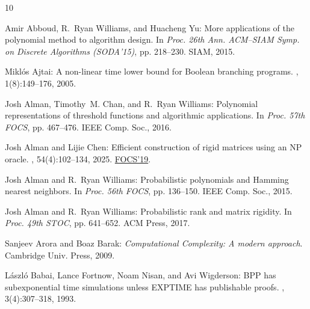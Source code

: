 \documentclass[11pt]{article}
\begin{document}
\tocrefpdfbookmark
\begin{thebibliography}{10}

{\sc Amir Abboud, R.~Ryan Williams, and Huacheng Yu}: More applications of the
  polynomial method to algorithm design.
\newblock In {\em Proc. 26th Ann. ACM--SIAM Symp. on Discrete Algorithms
  (SODA'15)}, pp. 218--230. SIAM, 2015.
\newblock [\epfmtdoi{10.1137/1.9781611973730.17}]

{\sc Mikl{\'o}s Ajtai}: A non-linear time lower bound for {B}oolean branching
  programs.
, 1(8):149--176, 2005.

{\sc Josh Alman, Timothy~M. Chan, and R.~Ryan Williams}: Polynomial
  representations of threshold functions and algorithmic applications.
\newblock In {\em Proc. 57th FOCS}, pp. 467--476. IEEE Comp. Soc., 2016.

{\sc Josh Alman and Lijie Chen}: Efficient construction of rigid matrices using
  an {NP} oracle.
, 54(4):102--134, 2025.
\newblock \prelim \href{https://doi.org/10.1109/FOCS.2019.00067}{FOCS'19}.
\newblock [\epfmtdoi{10.1137/20M1322297}]

{\sc Josh Alman and R.~Ryan Williams}: Probabilistic polynomials and {H}amming
  nearest neighbors.
\newblock In {\em Proc. 56th FOCS}, pp. 136--150. IEEE Comp. Soc., 2015.

{\sc Josh Alman and R.~Ryan Williams}: Probabilistic rank and matrix rigidity.
\newblock In {\em Proc. 49th STOC}, pp. 641--652. ACM Press, 2017.
\newblock [\epfmtdoi{10.1145/3055399.3055484}]

{\sc Sanjeev Arora and Boaz Barak}: {\em Computational Complexity: A modern
  approach}.
\newblock Cambridge Univ. Press, 2009.

{\sc L{\'a}szl{\'o} Babai, Lance Fortnow, Noam Nisan, and Avi Wigderson}: {BPP}
  has subexponential time simulations unless {EXPTIME} has publishable proofs.
, 3(4):307--318, 1993.
\newblock [\epfmtdoi{10.1007/BF01275486}]


\end{thebibliography}
\end{document}

